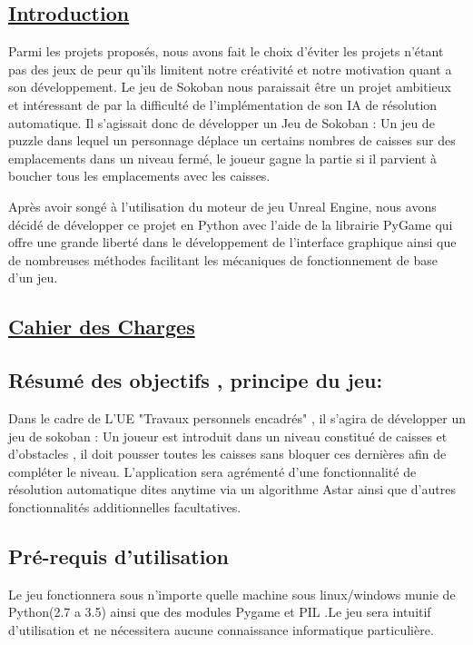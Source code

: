 \documentclass{article}
\begin{document}
\newpage
\begin{center}
	\section{\underline{Introduction}}
	\vspace{2 cm}
	Parmi les projets proposés, nous avons fait le choix d’éviter les projets n’étant
pas des jeux de peur qu’ils limitent notre créativité et notre motivation quant a
son développement. Le jeu de Sokoban nous paraissait être un projet ambitieux
et intéressant de par la difficulté de l’implémentation de son IA de résolution automatique.
Il s'agissait donc de développer un Jeu de Sokoban : Un jeu de puzzle dans
lequel un personnage déplace un certains nombres de caisses sur des emplacements
dans un niveau fermé, le joueur gagne la partie si il parvient à boucher
tous les emplacements avec les caisses.

Après avoir songé à l’utilisation du moteur de jeu Unreal Engine, nous avons
décidé de développer ce projet en Python avec l’aide de la librairie PyGame
qui offre une grande liberté dans le développement de l'interface graphique ainsi que de nombreuses
méthodes facilitant les mécaniques de fonctionnement de base d’un jeu.

\end{center}

\newpage
\begin{center}
	\section{\underline{Cahier des Charges}}
	\vspace{2 cm}
	\end{center}
		\subsection{Résumé des objectifs , principe du jeu:}
		\vspace{1cm}
		Dans le cadre de L'UE "Travaux personnels encadrés" , il s'agira de développer un jeu de sokoban : Un joueur est introduit dans un niveau constitué de caisses et d'obstacles , il doit pousser toutes les caisses sans bloquer ces dernières afin de compléter le niveau.
		L'application sera agrémenté d'une fonctionnalité de résolution automatique dites anytime via un algorithme Astar ainsi que d'autres fonctionnalités additionnelles facultatives.
		
		
		\subsection{Pré-requis d'utilisation}
		\vspace{1cm}
		Le jeu fonctionnera sous n'importe quelle machine sous linux/windows munie de Python(2.7 a 3.5) ainsi que des modules Pygame et PIL .Le jeu sera intuitif d’utilisation et ne nécessitera aucune connaissance informatique particulière.
\end{document}
